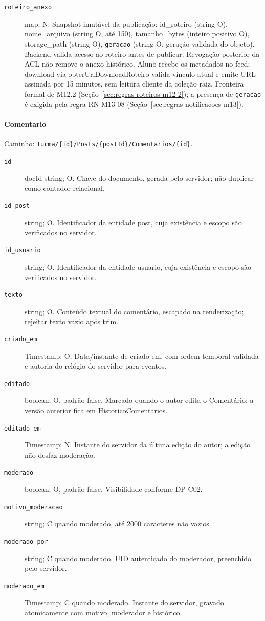 \begin{description}
\item[\texttt{roteiro\_anexo}] map; N. Snapshot imutável da publicação: id\_roteiro (string O), nome\_arquivo (string O, até 150), tamanho\_bytes (inteiro positivo O), storage\_path (string O), \texttt{geracao} (string O, geração validada do objeto). Backend valida acesso ao roteiro antes de publicar. Revogação posterior da ACL não remove o anexo histórico. Aluno recebe os metadados no feed; download via obterUrlDownloadRoteiro valida vínculo atual e emite URL assinada por 15 minutos, sem leitura cliente da coleção raiz. Fronteira formal de M12.2 (Seção~\ref{sec:regras-roteiros-m12-2}); a presença de \texttt{geracao} é exigida pela regra RN-M13-08 (Seção~\ref{sec:regras-notificacoes-m13}).
\end{description}

\paragraph{Comentario}\mbox{}\par
Caminho: \texttt{Turma/\{id\}/Posts/\{postId\}/Comentarios/\{id\}}.
\begin{description}
\item[\texttt{id}] docId string; O. Chave do documento, gerada pelo servidor; não duplicar como contador relacional.
\item[\texttt{id\_post}] string; O. Identificador da entidade post, cuja existência e escopo são verificados no servidor.
\item[\texttt{id\_usuario}] string; O. Identificador da entidade usuario, cuja existência e escopo são verificados no servidor.
\item[\texttt{texto}] string; O. Conteúdo textual do comentário, escapado na renderização; rejeitar texto vazio após trim.
\item[\texttt{criado\_em}] Timestamp; O. Data/instante de criado em, com ordem temporal validada e autoria do relógio do servidor para eventos.
\item[\texttt{editado}] boolean; O, padrão false. Marcado quando o autor edita o Comentário; a versão anterior fica em HistoricoComentarios.
\item[\texttt{editado\_em}] Timestamp; N. Instante do servidor da última edição do autor; a edição não desfaz moderação.
\item[\texttt{moderado}] boolean; O, padrão false. Visibilidade conforme DP-C02.
\item[\texttt{motivo\_moderacao}] string; C quando moderado, até 2000 caracteres não vazios.
\item[\texttt{moderado\_por}] string; C quando moderado. UID autenticado do moderador, preenchido pelo servidor.
\item[\texttt{moderado\_em}] Timestamp; C quando moderado. Instante do servidor, gravado atomicamente com motivo, moderador e histórico.
\end{description}

